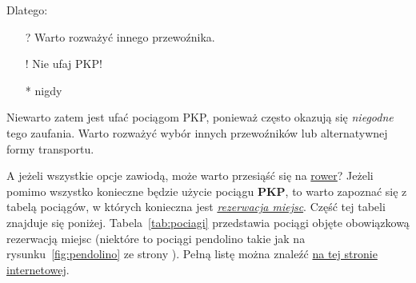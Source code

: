 Dlatego:
\begin{itemize}
    \item[?] Warto rozważyć innego przewoźnika.
    \item[!] Nie ufaj PKP!
    \item[*] nigdy
\end{itemize}

Niewarto zatem jest ufać pociągom PKP, ponieważ często okazują się \emph{niegodne} tego zaufania. Warto rozważyć wybór innych przewoźników lub alternatywnej formy transportu.\par
A jeżeli wszystkie opcje zawiodą, może warto przesiąść się na \underline{rower}? Jeżeli pomimo wszystko konieczne będzie użycie pociągu \textbf{PKP}, to warto zapoznać się z tabelą pociągów, w których konieczna jest \underline{\textit{rezerwacja miejsc}}. Część tej tabeli znajduje się poniżej. Tabela~\ref{tab:pociagi} przedstawia pociągi objęte obowiązkową rezerwacją miejsc (niektóre to pociągi pendolino takie jak na rysunku~\ref{fig:pendolino} ze strony \pageref{fig:pendolino}). Pełną listę można znaleźć \href{https://www.intercity.pl/pl/site/o-nas/dzial-prasowy/komunikaty/lista-pociagow-objetych-obowiazkowa-rezerwacja-miejsc.html}{na tej stronie internetowej}.


